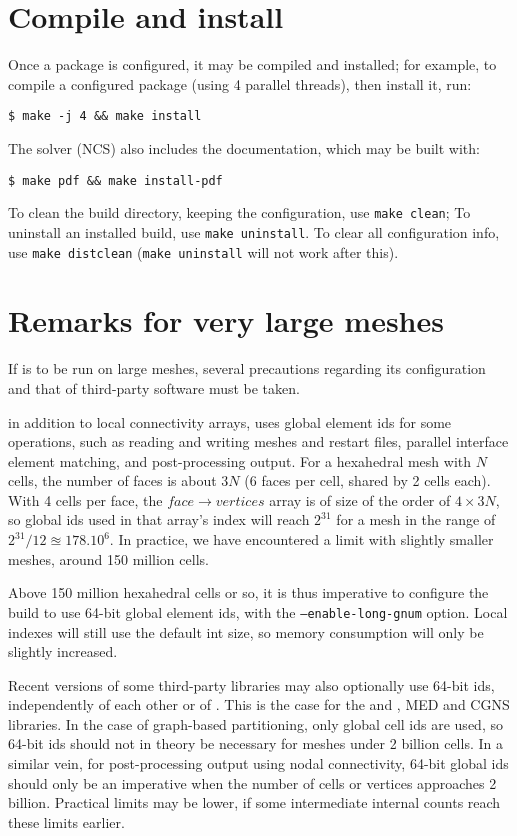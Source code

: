 \documentclass[a4paper,10pt,twoside]{article}
\begin{document}
\section{Compile and install\label{sec:compile}}

Once a package is configured, it may be compiled and installed;
for example, to compile a configured package (using 4 parallel threads),
then install it, run:

\texttt{\$ make -j 4 \&\& make install}

The solver (NCS) also includes the documentation, which may be built
with:

\texttt{\$ make pdf \&\& make install-pdf}

To clean the build directory, keeping the configuration,
use \texttt{make clean};
To uninstall an installed build, use \texttt{make uninstall}.
To clear all configuration info, use \texttt{make distclean}
(\texttt{make uninstall} will not work after this).

\section{Remarks for very large meshes\label{sec:config:largemesh}}

If \CS is to be run on large meshes, several precautions regarding
its configuration and that of third-party software must be taken.

in addition to local connectivity arrays, \CS uses global element ids
for some operations, such as reading and writing meshes and restart files,
parallel interface element matching, and post-processing output.
For a hexahedral mesh with $N$ cells,
the number of faces is about $3N$ (6 faces per cell, shared by 2 cells each).
With 4 cells per face, the $face \rightarrow vertices$ array is of size
of the order of $4\times3N$, so global ids used in that array's index
will reach $2^{31}$ for a mesh in the range of $2^{31} / 12 \approxeq 178.10^6$.
In practice, we have encountered a limit with slightly smaller meshes,
around 150 million cells.

Above 150 million hexahedral cells or so, it is thus imperative to configure
the build to use 64-bit global element ids, with the
{\tt --enable-long-gnum} option. Local indexes will still use
the default {int} size, so memory consumption will only be slightly
increased.

Recent versions of some third-party libraries may also optionally use 64-bit ids,
independently of each other or of \CS.
This is the case for the \scotch and \metis, MED and
CGNS libraries. In the case of graph-based partitioning, only
global cell ids are used, so 64-bit ids should not in theory be necessary
for meshes under 2 billion cells. In a similar vein, for post-processing output
using nodal connectivity, 64-bit global ids should only be an imperative
when the number of cells or vertices approaches 2 billion.
Practical limits may be lower, if some intermediate internal counts
reach these limits earlier.
\end{document}
